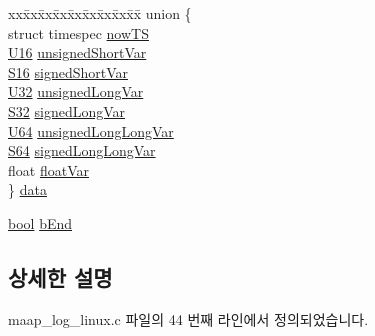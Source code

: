 \begin{DoxyCompactItemize}
\begin{tabbing}
\end{tabbing}\item 
\begin{tabbing}
xx\=xx\=xx\=xx\=xx\=xx\=xx\=xx\=xx\=\kill
union \{\\
\>struct timespec \hyperlink{structlog__rt__queue__item__t_a7f62ac5d8f12c4bf0d29e42e8dff68df}{nowTS}\\
\>\hyperlink{openavb__types__base__pub_8h_a0a0a322d5fa4a546d293a77ba8b4a71f}{U16} \hyperlink{structlog__rt__queue__item__t_a2198c1c7f1d16fcf744aa8006bc18656}{unsignedShortVar}\\
\>\hyperlink{openavb__types__base__pub_8h_a6d241ad21a823c90d4835380787db5d4}{S16} \hyperlink{structlog__rt__queue__item__t_abdaf892cf01ad7bbeb216839491dd80b}{signedShortVar}\\
\>\hyperlink{openavb__types__base__pub_8h_a696390429f2f3b644bde8d0322a24124}{U32} \hyperlink{structlog__rt__queue__item__t_afc635ba0336fa2c6b55f3ad3d0f18efc}{unsignedLongVar}\\
\>\hyperlink{openavb__types__base__pub_8h_a39c786017723555afb9e8b85accec0de}{S32} \hyperlink{structlog__rt__queue__item__t_a017123d52a755c56391f021cc7d01dee}{signedLongVar}\\
\>\hyperlink{openavb__types__base__pub_8h_a25809e0734a149248fcf5831efa4e33d}{U64} \hyperlink{structlog__rt__queue__item__t_a9ecdee09e96c0404077dc8723bbd8b30}{unsignedLongLongVar}\\
\>\hyperlink{openavb__types__base__pub_8h_a1d293e5c494dd6826239b02f5fe98e7f}{S64} \hyperlink{structlog__rt__queue__item__t_aeb5fb95fcffa5ba2f3b113eee40395b8}{signedLongLongVar}\\
\>float \hyperlink{structlog__rt__queue__item__t_a097418d0271cd5318e481be1ae56c841}{floatVar}\\
\} \hyperlink{structlog__rt__queue__item__t_a22339528cfd7996fe83508f57491d554}{data}\\

\end{tabbing}\item 
\hyperlink{avb__gptp_8h_af6a258d8f3ee5206d682d799316314b1}{bool} \hyperlink{structlog__rt__queue__item__t_a26c28e5f662accb923a5ea923c947434}{b\+End}
\end{DoxyCompactItemize}


\subsection{상세한 설명}


maap\+\_\+log\+\_\+linux.\+c 파일의 44 번째 라인에서 정의되었습니다.




